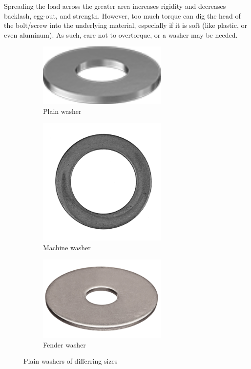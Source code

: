 	Spreading the load across the greater area increases rigidity and decreases backlash, egg-out, and strength. However, too much torque can dig the head of the bolt/screw into the underlying material, especially if it is soft (like plastic, or even aluminum). As such, care not to overtorque, or a washer may be needed.
	\begin{figure}[H]
		\centering
		\begin{subfigure}[b]{.24\linewidth}
			\includegraphics[width=0.7\textwidth]{imgs/plainwasher.png}
			\caption{Plain washer}
		\end{subfigure}\begin{subfigure}[b]{.24\linewidth}
			\includegraphics[width=0.7\textwidth]{imgs/machinewasher.png}
			\caption{Machine washer}
		\end{subfigure}\begin{subfigure}[b]{.24\linewidth}
			\includegraphics[width=0.7\textwidth]{imgs/fenderwasher.png}
			\caption{Fender washer}
		\end{subfigure}
		\caption{Plain washers of differring sizes}
	\end{figure}
	
